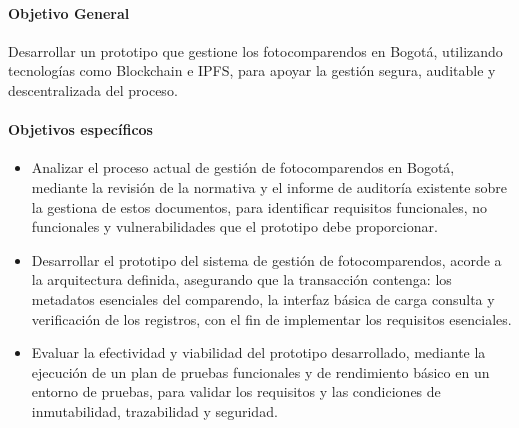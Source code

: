 \paragraph{Objetivo General}
Desarrollar un prototipo que gestione los fotocomparendos en Bogotá, utilizando tecnologías como Blockchain e IPFS, para apoyar la gestión segura, auditable y descentralizada del proceso.
\paragraph{Objetivos específicos}
\begin{itemize}
    \item Analizar el proceso actual de gestión de fotocomparendos en Bogotá, mediante la revisión de la normativa y el informe de auditoría existente sobre la gestiona de estos documentos, para identificar requisitos funcionales, no funcionales y vulnerabilidades que el prototipo debe proporcionar.
    \item Desarrollar el prototipo del sistema de gestión de fotocomparendos, acorde a la arquitectura definida, asegurando que la transacción contenga: los metadatos esenciales del comparendo, la interfaz básica de carga consulta y verificación de los registros, con el fin de implementar los requisitos esenciales.
    \item Evaluar la efectividad y viabilidad del prototipo desarrollado, mediante la ejecución de un plan de pruebas funcionales y de rendimiento básico en un entorno de pruebas, para validar los requisitos y las condiciones de inmutabilidad, trazabilidad y seguridad. 
\end{itemize} 